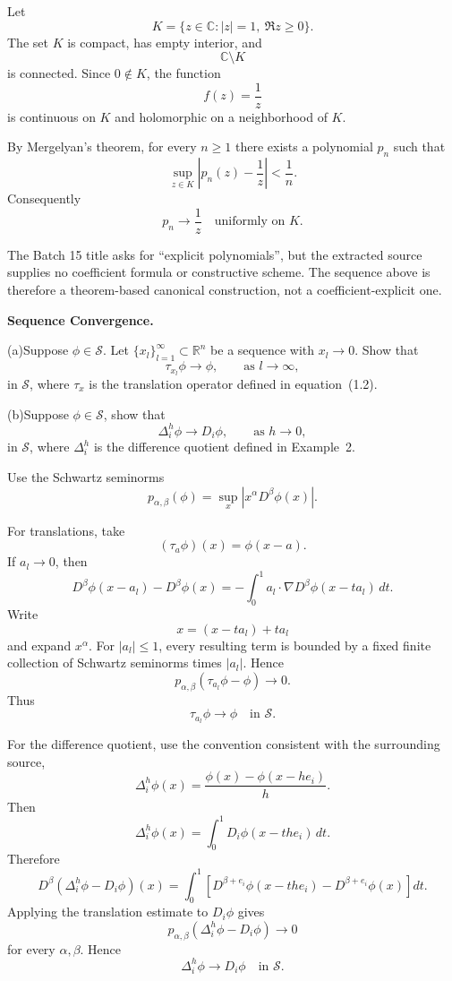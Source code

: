 \begin{solution}
Let
\[
K=\{z\in\mathbb C:|z|=1,\ \Re z\ge0\}.
\]
The set \(K\) is compact, has empty interior, and
\[
\mathbb C\setminus K
\]
is connected. Since \(0\notin K\), the function
\[
f(z)=\frac1z
\]
is continuous on \(K\) and holomorphic on a neighborhood of \(K\).

By Mergelyan's theorem, for every \(n\ge1\) there exists a polynomial \(p_n\) such that
\[
\sup_{z\in K}
\left|
p_n(z)-\frac1z
\right|
<
\frac1n.
\]
Consequently
\[
\boxed{
p_n\to\frac1z
\quad\text{uniformly on }K.
}
\]

The Batch 15 title asks for ``explicit polynomials'', but the extracted source supplies no
coefficient formula or constructive scheme. The sequence above is therefore a theorem-based
canonical construction, not a coefficient-explicit one.
\end{solution}


\begin{problem}[CP-II-0385]
\label{prob:cp-ii-0385}
\textbf{Sequence Convergence.}

\par\hspace*{1.5em} (a)\quad Suppose $\phi\in\mathcal{S}$.  Let $\{x_l\}_{l=1}^\infty
	\subset\mathbb{R}^n$ be a sequence with $x_l\to 0$.
	Show that
	\[
	\tau_{x_l}\phi \to \phi, \qquad \text{as } l\to\infty,
	\]
	in $\mathcal{S}$, where $\tau_x$ is the translation
	operator defined in equation~(1.2).

	\par\noindent (b)\quad Suppose $\phi\in\mathcal{S}$, show that
	\[
	\Delta_i^h \phi \to D_i\phi, \qquad \text{as } h\to 0,
	\]
	in $\mathcal{S}$, where $\Delta_i^h$ is the difference
	quotient defined in Example~2.
\end{problem}

\begin{solution}
Use the Schwartz seminorms
\[
p_{\alpha,\beta}(\phi)
=
\sup_x|x^\alpha D^\beta\phi(x)|.
\]

For translations, take
\[
(\tau_a\phi)(x)=\phi(x-a).
\]
If \(a_l\to0\), then
\[
D^\beta\phi(x-a_l)-D^\beta\phi(x)
=
-\int_0^1
a_l\cdot\nabla D^\beta\phi(x-ta_l)\,dt.
\]
Write
\[
x=(x-ta_l)+ta_l
\]
and expand \(x^\alpha\). For \(|a_l|\le1\), every resulting term is bounded by a fixed
finite collection of Schwartz seminorms times \(|a_l|\). Hence
\[
p_{\alpha,\beta}(\tau_{a_l}\phi-\phi)
\longrightarrow0.
\]
Thus
\[
\boxed{
\tau_{a_l}\phi\to\phi
\quad\text{in }\mathcal S.
}
\]

For the difference quotient, use the convention consistent with the surrounding source,
\[
\Delta_i^h\phi(x)
=
\frac{\phi(x)-\phi(x-he_i)}{h}.
\]
Then
\[
\Delta_i^h\phi(x)
=
\int_0^1D_i\phi(x-th e_i)\,dt.
\]
Therefore
\[
D^\beta(\Delta_i^h\phi-D_i\phi)(x)
=
\int_0^1
\left[
D^{\beta+e_i}\phi(x-th e_i)
-
D^{\beta+e_i}\phi(x)
\right]dt.
\]
Applying the translation estimate to \(D_i\phi\) gives
\[
p_{\alpha,\beta}(\Delta_i^h\phi-D_i\phi)\to0
\]
for every \(\alpha,\beta\). Hence
\[
\boxed{
\Delta_i^h\phi\to D_i\phi
\quad\text{in }\mathcal S.
}
\]
\end{solution}


